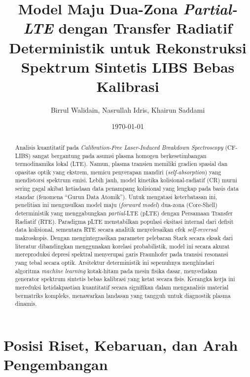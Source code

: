 \documentclass[10pt,leqno]{amsart}
\begin{document}
\title{Model Maju Dua-Zona \textit{Partial-LTE} dengan Transfer Radiatif
Deterministik untuk Rekonstruksi Spektrum Sintetis LIBS Bebas Kalibrasi}

\author[Walidain, Idris, Saddami]{Birrul Walidain, Nasrullah Idris, Khairun Saddami}
\date{\today}
\address{Department of Physics, Faculty of Mathematics and Natural Sciences,
Universitas Syiah Kuala, Banda Aceh, Indonesia}

\begin{abstract}
Analisis kuantitatif pada \textit{Calibration-Free Laser-Induced Breakdown Spectroscopy} (CF-LIBS) sangat bergantung pada asumsi plasma homogen berkesetimbangan termodinamika lokal (LTE). Namun, plasma transien memiliki gradien spasial dan opasitas optik yang ekstrem, memicu penyerapan mandiri (\textit{self-absorption}) yang mendistorsi spektrum emisi. Lebih jauh, model kinetika kolisional-radiatif (CR) murni sering gagal akibat ketiadaan data penampang kolisional yang lengkap pada basis data standar (fenomena ``Gurun Data Atomik''). Untuk mengatasi keterbatasan ini, penelitian ini mengusulkan model maju (\textit{forward model}) dua-zona (Core-Shell) deterministik yang menggabungkan \textit{partial}-LTE (pLTE) dengan Persamaan Transfer Radiatif (RTE). Paradigma pLTE menstabilkan populasi eksitasi internal dari defisit data kolisional, sementara RTE secara analitik menyelesaikan efek \textit{self-reversal} makroskopis. Dengan mengintegrasikan parameter pelebaran Stark secara eksak dari literatur dibandingkan menggunakan korelasi probabilistik, model ini secara akurat mereproduksi depresi spektral menyerupai garis Fraunhofer pada transisi resonansi yang tebal secara optik. Arsitektur deterministik ini sepenuhnya menghindari algoritma \textit{machine learning} kotak-hitam pada mesin fisika dasar, menyediakan generator spektrum sintetis bebas kalibrasi yang ketat secara fisis. Kerangka kerja ini mereduksi ketidakpastian kuantitatif secara signifikan dalam menganalisis material bermatriks kompleks, menawarkan landasan yang tangguh untuk diagnostik plasma dinamis.
\end{abstract}

\maketitle

\bigskip

\section{Posisi Riset, Kebaruan, dan Arah Pengembangan}
\end{document}
